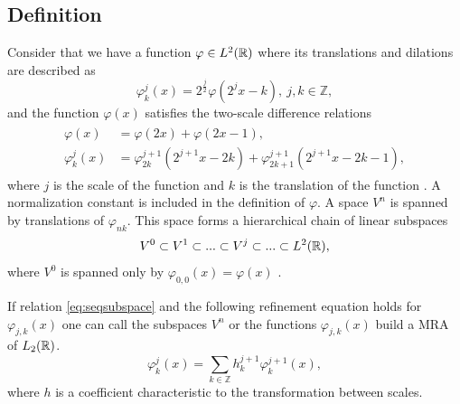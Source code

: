\documentclass[../master_thesis.tex]{subfiles}
\begin{document}
\subsection{Definition}
Consider that we have a function $\varphi \in L^2(\mathbb{R})$ where its translations
and dilations are described as \cite{Schneider:2007}
\begin{equation}
  \varphi^j_k(x) = 2^{\frac{j}{2}}\varphi(2^jx - k),\  j,k \in \mathbb{Z},
\end{equation}
and the function $\varphi(x)$ satisfies the two-scale difference relations \cite{Beylkin:MRA, Schneider:2007, Sorland}
\begin{align}
  \begin{split}
    \varphi(x) &= \varphi(2x) + \varphi(2x - 1),\\
    \varphi^j_k(x) &= \varphi^{j+1}_{2k}(2^{j+1}x - 2k) + \varphi^{j+1}_{2k+1}(2^{j+1}x - 2k - 1),
  \end{split}
\end{align}
where $j$ is the scale of the function and $k$ is the translation of the function
\cite{Sorland}. A normalization constant is included in the definition of $\varphi$.
A space $V^n$ is spanned by translations of $\varphi_{nk}$. This space forms a
hierarchical chain of linear
subspaces \cite{Beylkin:MRA}
\begin{equation}
  V^0 \subset V^1 \subset ... \subset V^j \subset ... \subset L^2(\mathbb{R})\label{eq:seqsubspace},
\end{equation}
where $V^0$ is spanned only by $\varphi_{0,0}(x)=\varphi(x)$ \cite{Sorland}.

If relation \ref{eq:seqsubspace} and the following refinement equation holds for $\varphi_{j,k}(x)$
one can call the subspaces $V^n$ or the functions $\varphi_{j,k}(x)$ build a \ac{MRA} of $L_2(\mathbb{R})$.
\begin{equation}
\varphi^j_k(x) = \sum_{k\in\mathbb{Z}} h^{j+1}_k\varphi^{j+1}_k(x),
\end{equation}
where $h$ is a coefficient characteristic to the transformation between scales.
\end{document}
